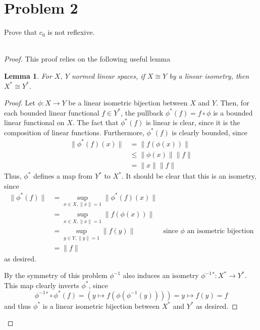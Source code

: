 \documentclass[fontsize=11pt]{scrartcl} %
\numberwithin{equation}{section} %
\numberwithin{figure}{section} %
\numberwithin{table}{section} %
\newtheorem{lemma}{Lemma}
\begin{document}
\newpage

\section*{Problem 2}
Prove that $c_0$ is not reflexive.
\\
\\
\begin{proof}
    This proof relies on the following useful lemma
    \begin{lemma}
        For $X$, $Y$ normed linear spaces, if $X\cong Y$ by a linear isometry,
        then $X^*\cong Y^*$.
    \end{lemma}
    \begin{proof}
        Let $\phi:X\to Y$ be a linear isometric bijection between $X$ and $Y$.
        Then, for each bounded linear functional $f\in Y^*$, the pullback
        $\phi^*(f) = f\circ\phi$ is a bounded linear functional on $X$. The fact
        that $\phi^*(f)$ is linear is clear, since it is the composition of
        linear functions. Furthermore, $\phi^*(f)$ is clearly bounded, since
        \[
            \begin{aligned}
                \|\phi^*(f)(x)\| &= \|f(\phi(x))\|\\
                &\leq \|\phi(x)\|\|f\|\\
                &=\|x\|\|f\|
            \end{aligned}
        \]
        Thus, $\phi^*$ defines a map from $Y^*$ to $X^*$. It should be clear
        that this is an isometry, since
        \[
\begin{aligned}
    \|\phi^*(f)\| &= \sup_{x\in X,\|x\|=1} \|\phi^*(f)(x)\|\\
    &= \sup_{x\in X,\|x\|=1} \|f(\phi(x))\|\\
    &= \sup_{y\in Y, \|y\|=1} \|f(y)\| &\text{since $\phi$ an isometric
    bijection}\\
    &= \|f\|
\end{aligned}
        \]
        as desired.

        By the symmetry of this problem $\phi^{-1}$ also induces an isometry
        $\phi^{-1}{}^*:X^*\to Y^*$. This map clearly inverts $\phi^*$, since
        \[
            \phi^{-1}{}^*\circ\phi^*(f) = (y\mapsto f(\phi(\phi^{-1}(y)))) =
            y\mapsto f(y) = f
        \]
        and thus $\phi^*$ is a linear isometric bijection between $X^*$ and
        $Y^*$ as desired.
    \end{proof}


\end{proof}
\end{document}
